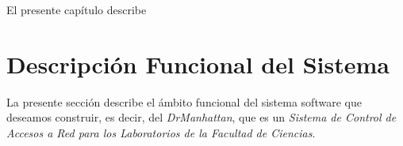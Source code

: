 ﻿%


\label{chap:planificacion}


El presente cap\'itulo describe 

\chaptertoc

\section{Descripción Funcional del Sistema}
\label{sec:planificacion:descFuncional}

La presente sección describe el ámbito funcional del sistema software que deseamos construir, es decir, del \emph{DrManhattan}, que es un \emph{Sistema de Control de Accesos a Red para los Laboratorios de la Facultad de Ciencias}.\newline


